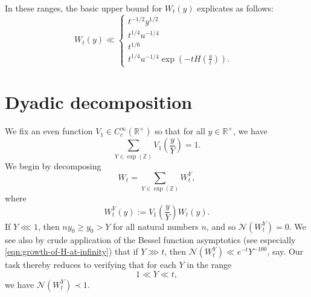 \documentclass[reqno]{amsart} 
\begin{document}
In these ranges, the basic upper bound for $W_t(y)$ explicates as follows:
\begin{equation*}
  W _t (y) \ll
  \begin{cases}
    t ^{- 1/2} y ^{1/2}  &  \\
    t ^{1/4} u ^{- 1/4}         &  \\
    t ^{1/6}                        &  \\
    t ^{1/4} u ^{- 1/4} \exp (- t H (\tfrac{y}{t})).                         &
  \end{cases}
\end{equation*}

\section{Dyadic decomposition}\label{sec:cqx50az4v6}
We fix an even function $V_1 \in C_c^\infty(\mathbb{R}^\times)$ so that for all $y \in \mathbb{R}^\times$, we have
\begin{equation*}
  \sum _{Y \in \exp(\mathbb{Z})} V_1\left(\frac{y}{Y}\right) = 1. 
\end{equation*}
We begin by decomposing
\begin{equation*}
  W_t = \sum _{Y \in \exp(\mathbb{Z})} W_t^Y,
\end{equation*}
where
\begin{equation*}
  W_t^Y(y) := V_1\left(\frac{y}{Y}\right) W_t(y).
\end{equation*}
If $Y \lll 1$, then $n y_0  \geq y_0> Y$ for all natural numbers $n$, and so $\mathcal{N}(W_t^Y) = 0$.  We see also by crude application of the Bessel function asymptotics (see especially \eqref{eqn:growth-of-H-at-infinity}) that if $Y \ggg t$, then $\mathcal{N}(W_t^Y) \ll e^{-t} Y^{-100}$, say.  Our task thereby reduces to verifying that for each $Y$ in the range
\begin{equation}\label{eqn:Y-between-1-and-t}
  1 \ll Y \ll t,
\end{equation}
we have $\mathcal{N}(W_t^Y) \prec 1$.
\end{document}
